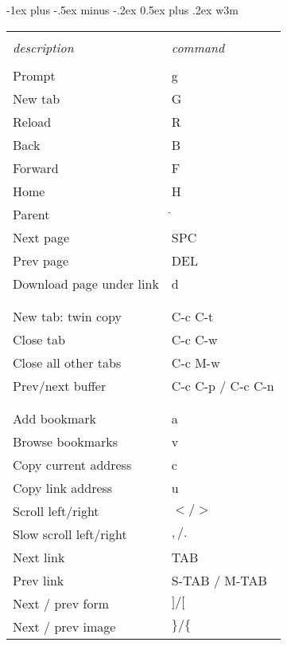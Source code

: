 \documentclass[10pt,landscape]{article}
\makeatletter
\renewcommand{\section}{\@startsection{section}{1}{0mm}%
                                {-1ex plus -.5ex minus -.2ex}%
                                {0.5ex plus .2ex}%
                                {\normalfont\large\bfseries}}
\renewcommand{\subsection}{\@startsection{subsection}{2}{0mm}%
                                {-1explus -.5ex minus -.2ex}%
                                {0.5ex plus .2ex}%
                                {\normalfont\normalsize\bfseries}}
\makeatother
\begin{document}
\begin{multicols}{3}
\section{w3m}
\begin{tabular}{ll}
  &\\
\emph{description} & \emph{command}\\
\hline
&\\
Prompt & g \\
New tab & G \\
Reload & R \\
Back & B \\
Forward & F\\
Home & H\\
Parent & $\hat{}$\\
Next page & SPC \\
Prev page & DEL \\
Download page under link & d\\
&\\
\hline
&\\
New tab: twin copy & C-c C-t\\
Close tab & C-c C-w \\
Close all other tabs & C-c M-w\\
Prev/next buffer & C-c C-p / C-c C-n\\
&\\
\hline
&\\
Add bookmark & a\\
Browse bookmarks & v\\
Copy current address & c \\
Copy link address & u \\
Scroll left/right & $</>$\\
Slow scroll left/right & $,/.$\\
Next link & TAB \\
Prev link & S-TAB / M-TAB\\
Next / prev form & $]/[$\\
Next / prev image & $\}/\{$\\
\end{tabular}

\newpage

\end{multicols}
\end{document}
